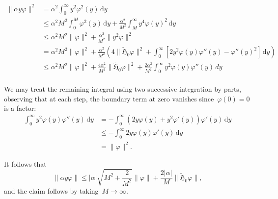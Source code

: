 \documentclass[10pt]{article}
\renewcommand{\d}{\mathrm{d}}
\newcommand{\1}{\mathbbm 1}
\begin{document}
    \begin{equation}
        \begin{aligned}
            \|\alpha y\varphi\|^2 &= \alpha^2\int_0^\infty y^2\varphi^2(y)\,\d y\\
            &\leq \alpha^2 M^2\int_0^M \varphi^2(y)\,\d y + \frac{\alpha^2}{M^2}\int_M^\infty y^4\varphi(y)^2\,\d y\\
            &\leq \alpha^2 M^2\|\varphi\|^2 + \frac{\alpha^2}{M^2}\|y^2\varphi\|^2\\
             &= \alpha^2M^2\|\varphi\|^2 + \frac{\alpha^2}{M^2}\left(4\|\widetilde{\mathfrak H}_0\varphi\|^2 +\int_0^\infty \left[2y^2 \varphi(y)\varphi''(y)-\varphi''(y)^2\right]\,\d y\right)\\
             &\leq \alpha^2 M^2\|\varphi\|^2 + \frac{4\alpha^2}{M^2}\|\widetilde{\mathfrak H}_0 \varphi\|^2 + \frac{2\alpha^2}{M^2}\int_0^\infty y^2 \varphi(y)\varphi''(y)\, d y\\
        \end{aligned}
    \end{equation}

    We may treat the remaining integral using two successive integration by parts, observing that at each step, the boundary term at zero vanishes since~$\varphi(0)=0$ is a factor:
    \begin{equation}
        \begin{aligned}
            \int_0^\infty y^2\varphi(y)\varphi''(y)\,\d y &= -\int_0^\infty (2y\varphi(y) + y^2 \varphi'(y))\varphi'(y)\,\d y\\
            & \leq -\int_0^\infty 2y\varphi(y)\varphi'(y)\, \d y\\
            &= \|\varphi\|^2.
        \end{aligned}
    \end{equation}

    It follows that
    \begin{equation}
        \label{eq:relative_bound}
        \|\alpha y \varphi\| \leq |\alpha|\sqrt{M^2+\frac{2}{M^2}}\|\varphi\| + \frac{2|\alpha|}M \| \widetilde{\mathfrak H}_0 \varphi\|,
    \end{equation}
    and the claim follows by taking~$M\to \infty$.
\end{document}
